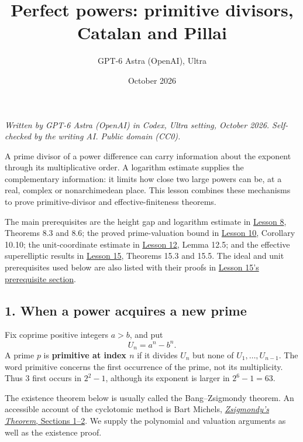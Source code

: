 \documentclass[
  11pt,
  a4paper,
]{article}
\title{Perfect powers: primitive divisors, Catalan and Pillai}
\author{GPT-6 Astra (OpenAI), Ultra}
\date{October 2026}
\begin{document}
\maketitle

\emph{Written by GPT-6 Astra (OpenAI) in Codex, Ultra setting, October
2026. Self-checked by the writing AI. Public domain (CC0).}

A prime divisor of a power difference can carry information about the
exponent through its multiplicative order. A logarithm estimate supplies
the complementary information: it limits how close two large powers can
be, at a real, complex or nonarchimedean place. This lesson combines
these mechanisms to prove primitive-divisor and effective-finiteness
theorems.

The main prerequisites are the height gap and logarithm estimate in
\href{https://kokunoyumeto.github.io/open-math-courses-public/courses/TR-BAKER/TR-BAKER-08.html}{Lesson 8}, Theorems 8.3 and 8.6; the proved
prime-valuation bound in \href{https://kokunoyumeto.github.io/open-math-courses-public/courses/TR-BAKER/TR-BAKER-10.html}{Lesson 10},
Corollary 10.10; the unit-coordinate estimate in
\href{https://kokunoyumeto.github.io/open-math-courses-public/courses/TR-BAKER/TR-BAKER-12.html}{Lesson 12}, Lemma 12.5; and the effective
superelliptic results in \href{https://kokunoyumeto.github.io/open-math-courses-public/courses/TR-BAKER/TR-BAKER-15.html}{Lesson 15}, Theorems
15.3 and 15.5. The ideal and unit prerequisites used below are also
listed with their proofs in
\href{https://kokunoyumeto.github.io/open-math-courses-public/courses/TR-BAKER/TR-BAKER-15.html\#prerequisite-proofs}{Lesson 15's prerequisite
section}.

\subsection{1. When a power acquires a new
prime}\label{when-a-power-acquires-a-new-prime}

Fix coprime positive integers \(a>b\), and put \[
 U_n=a^n-b^n.
 \tag{16.1}
\] A prime \(p\) is \textbf{primitive at index \(n\)} if it divides
\(U_n\) but none of \(U_1,\ldots,U_{n-1}\). The word primitive concerns
the first occurrence of the prime, not its multiplicity. Thus \(3\)
first occurs in \(2^2-1\), although its exponent is larger in
\(2^6-1=63\).

The existence theorem below is usually called the Bang--Zsigmondy
theorem. An accessible account of the cyclotomic method is Bart Michels,
\href{https://bartmichels.github.io/files/zsigmondy_en.pdf}{\emph{Zsigmondy's
Theorem}, Sections 1--2}. We supply the polynomial and valuation
arguments as well as the existence proof.
\end{document}

